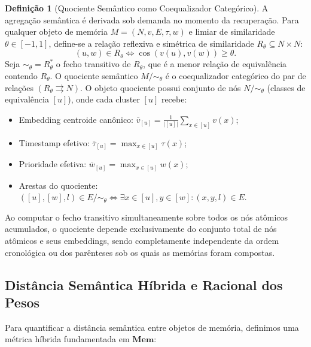 \documentclass[11pt,a4paper]{article}
\theoremstyle{definition}
\newtheorem{definicao}{Defini\c{c}\~ao}[section]
\begin{document}
\begin{definicao}[Quociente Sem\^antico como Coequalizador Categ\'orico]
A agrega\c{c}\~ao sem\^antica \'e derivada sob demanda no momento da recupera\c{c}\~ao. Para qualquer objeto de mem\'oria $M = (N, v, E, \tau, w)$ e limiar de similaridade $\theta \in [-1, 1]$, define-se a rela\c{c}\~ao reflexiva e sim\'etrica de similaridade $R_\theta \subseteq N \times N$:
\[
(u, w) \in R_\theta \iff \cos(v(u), v(w)) \geq \theta.
\]
Seja $\sim_\theta = R_\theta^*$ o fecho transitivo de $R_\theta$, que \'e a menor rela\c{c}\~ao de equival\^encia contendo $R_\theta$. O quociente sem\^antico $M / \sim_\theta$ \'e o coequalizador categ\'orico do par de rela\c{c}\~oes $(R_\theta \rightrightarrows N)$. O objeto quociente possui conjunto de n\'os $N / \sim_\theta$ (classes de equival\^encia $[u]$), onde cada cluster $[u]$ recebe:
\begin{itemize}
    \item Embedding centroide can\^onico: $\bar{v}_{[u]} = \frac{1}{|[u]|} \sum_{x \in [u]} v(x)$;
    \item Timestamp efetivo: $\bar{\tau}_{[u]} = \max_{x \in [u]} \tau(x)$;
    \item Prioridade efetiva: $\bar{w}_{[u]} = \max_{x \in [u]} w(x)$;
    \item Arestas do quociente: $([u], [w], l) \in E / \sim_\theta \iff \exists x \in [u], y \in [w] : (x, y, l) \in E$.
\end{itemize}
\end{definicao}

Ao computar o fecho transitivo simultaneamente sobre todos os n\'os at\^omicos acumulados, o quociente depende exclusivamente do conjunto total de n\'os at\^omicos e seus embeddings, sendo completamente independente da ordem cronol\'ogica ou dos par\^enteses sob os quais as mem\'orias foram compostas.

\subsection{Dist\^ancia Sem\^antica H\'ibrida e Racional dos Pesos}

Para quantificar a dist\^ancia sem\^antica entre objetos de mem\'oria, definimos uma m\'etrica h\'ibrida fundamentada em $\mathbf{Mem}$:
\end{document}
